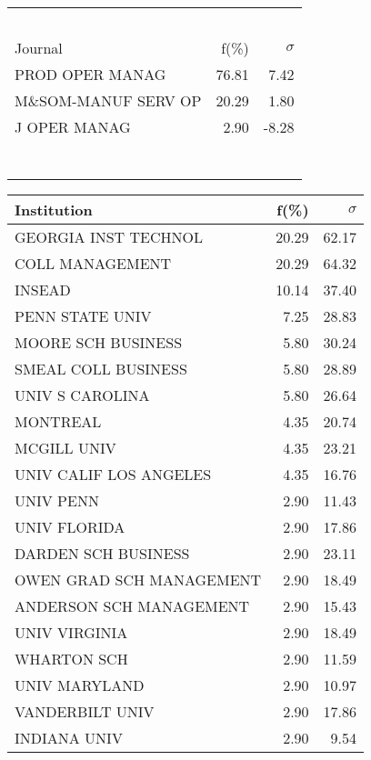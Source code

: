 \documentclass[a4paper,11pt]{report}
\begin{document}
\begin{landscape}
\begin{table}[!ht]
{\begin{tabular}{|l r  r|}
 &  & \\
 &  & \\
 &  & \\
 &  & \\
 &  & \\
\hline
\hline
Journal & f(\%) & $\sigma$\\
\hline
PROD OPER MANAG & 76.81 & 7.42\\
M\&SOM-MANUF SERV OP & 20.29 & 1.80\\
J OPER MANAG & 2.90 & -8.28\\
 &  & \\
 &  & \\
 &  & \\
 &  & \\
 &  & \\
 &  & \\
 &  & \\
\hline
\end{tabular}
}
{\scriptsize\begin{tabular}{|l r r|}
\hline
Institution & f(\%) & $\sigma$\\
\hline
GEORGIA INST TECHNOL & 20.29 & 62.17\\
COLL MANAGEMENT & 20.29 & 64.32\\
INSEAD & 10.14 & 37.40\\
PENN STATE UNIV & 7.25 & 28.83\\
MOORE SCH BUSINESS & 5.80 & 30.24\\
SMEAL COLL BUSINESS & 5.80 & 28.89\\
UNIV S CAROLINA & 5.80 & 26.64\\
MONTREAL & 4.35 & 20.74\\
MCGILL UNIV & 4.35 & 23.21\\
UNIV CALIF LOS ANGELES & 4.35 & 16.76\\
UNIV PENN & 2.90 & 11.43\\
UNIV FLORIDA & 2.90 & 17.86\\
DARDEN SCH BUSINESS & 2.90 & 23.11\\
OWEN GRAD SCH MANAGEMENT & 2.90 & 18.49\\
ANDERSON SCH MANAGEMENT & 2.90 & 15.43\\
UNIV VIRGINIA & 2.90 & 18.49\\
WHARTON SCH & 2.90 & 11.59\\
UNIV MARYLAND & 2.90 & 10.97\\
VANDERBILT UNIV & 2.90 & 17.86\\
INDIANA UNIV & 2.90 & 9.54\\
\hline
\hline

\end{tabular}}
\end{table}
\end{landscape}
\end{document}
